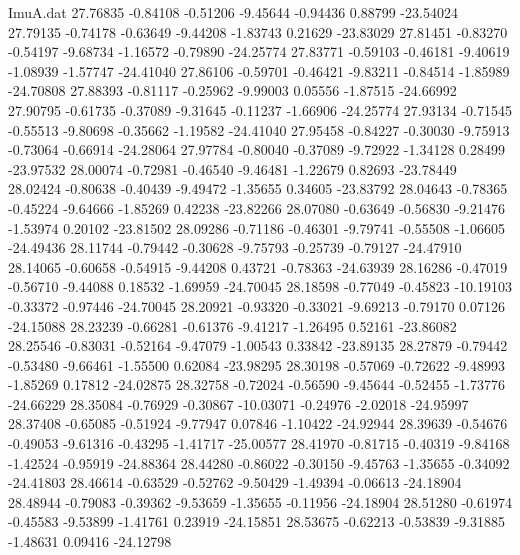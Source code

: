 \begin{filecontents}{ImuA.dat}
  27.76835   -0.84108   -0.51206   -9.45644   -0.94436    0.88799  -23.54024
  27.79135   -0.74178   -0.63649   -9.44208   -1.83743    0.21629  -23.83029
  27.81451   -0.83270   -0.54197   -9.68734   -1.16572   -0.79890  -24.25774
  27.83771   -0.59103   -0.46181   -9.40619   -1.08939   -1.57747  -24.41040
  27.86106   -0.59701   -0.46421   -9.83211   -0.84514   -1.85989  -24.70808
  27.88393   -0.81117   -0.25962   -9.99003    0.05556   -1.87515  -24.66992
  27.90795   -0.61735   -0.37089   -9.31645   -0.11237   -1.66906  -24.25774
  27.93134   -0.71545   -0.55513   -9.80698   -0.35662   -1.19582  -24.41040
  27.95458   -0.84227   -0.30030   -9.75913   -0.73064   -0.66914  -24.28064
  27.97784   -0.80040   -0.37089   -9.72922   -1.34128    0.28499  -23.97532
  28.00074   -0.72981   -0.46540   -9.46481   -1.22679    0.82693  -23.78449
  28.02424   -0.80638   -0.40439   -9.49472   -1.35655    0.34605  -23.83792
  28.04643   -0.78365   -0.45224   -9.64666   -1.85269    0.42238  -23.82266
  28.07080   -0.63649   -0.56830   -9.21476   -1.53974    0.20102  -23.81502
  28.09286   -0.71186   -0.46301   -9.79741   -0.55508   -1.06605  -24.49436
  28.11744   -0.79442   -0.30628   -9.75793   -0.25739   -0.79127  -24.47910
  28.14065   -0.60658   -0.54915   -9.44208    0.43721   -0.78363  -24.63939
  28.16286   -0.47019   -0.56710   -9.44088    0.18532   -1.69959  -24.70045
  28.18598   -0.77049   -0.45823  -10.19103   -0.33372   -0.97446  -24.70045
  28.20921   -0.93320   -0.33021   -9.69213   -0.79170    0.07126  -24.15088
  28.23239   -0.66281   -0.61376   -9.41217   -1.26495    0.52161  -23.86082
  28.25546   -0.83031   -0.52164   -9.47079   -1.00543    0.33842  -23.89135
  28.27879   -0.79442   -0.53480   -9.66461   -1.55500    0.62084  -23.98295
  28.30198   -0.57069   -0.72622   -9.48993   -1.85269    0.17812  -24.02875
  28.32758   -0.72024   -0.56590   -9.45644   -0.52455   -1.73776  -24.66229
  28.35084   -0.76929   -0.30867  -10.03071   -0.24976   -2.02018  -24.95997
  28.37408   -0.65085   -0.51924   -9.77947    0.07846   -1.10422  -24.92944
  28.39639   -0.54676   -0.49053   -9.61316   -0.43295   -1.41717  -25.00577
  28.41970   -0.81715   -0.40319   -9.84168   -1.42524   -0.95919  -24.88364
  28.44280   -0.86022   -0.30150   -9.45763   -1.35655   -0.34092  -24.41803
  28.46614   -0.63529   -0.52762   -9.50429   -1.49394   -0.06613  -24.18904
  28.48944   -0.79083   -0.39362   -9.53659   -1.35655   -0.11956  -24.18904
  28.51280   -0.61974   -0.45583   -9.53899   -1.41761    0.23919  -24.15851
  28.53675   -0.62213   -0.53839   -9.31885   -1.48631    0.09416  -24.12798

\end{filecontents}

